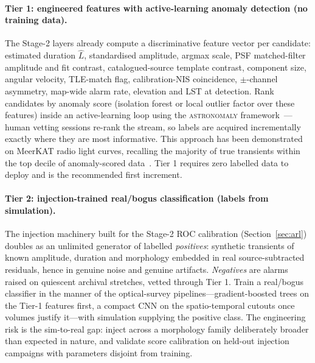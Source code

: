 \documentclass[11pt]{article}
\begin{document}
\paragraph{Tier 1: engineered features with active-learning anomaly detection (no training data).}
The Stage-2 layers already compute a discriminative feature vector per candidate: estimated
duration $\hat L$, standardised amplitude, argmax scale, PSF matched-filter amplitude and fit
contrast, catalogued-source template contrast, component size, angular velocity, TLE-match flag,
calibration-NIS coincidence, $\pm$-channel asymmetry, map-wide alarm rate, elevation and LST at
detection. Rank candidates by anomaly score (isolation forest or local outlier factor over these
features) inside an active-learning loop using the \textsc{astronomaly}
framework~\cite{lochner}---human vetting sessions re-rank the stream, so labels are acquired
incrementally exactly where they are most informative. This approach has been demonstrated on
MeerKAT radio light curves, recalling the majority of true transients within the top decile of
anomaly-scored data~\cite{andersson}. Tier 1 requires zero labelled data to deploy and is the
recommended first increment.

\paragraph{Tier 2: injection-trained real/bogus classification (labels from simulation).} The
injection machinery built for the Stage-2 ROC calibration (Section~\ref{sec:arl}) doubles as an
unlimited generator of labelled \emph{positives}: synthetic transients of known amplitude, duration
and morphology embedded in real source-subtracted residuals, hence in genuine noise and genuine
artifacts. \emph{Negatives} are alarms raised on quiescent archival stretches, vetted through
Tier 1. Train a real/bogus classifier in the manner of the optical-survey pipelines---gradient-boosted
trees on the Tier-1 features first, a compact CNN on the spatio-temporal cutouts once volumes
justify it---with simulation supplying the positive class. The engineering risk is the sim-to-real
gap: inject across a morphology family deliberately broader than expected in nature, and validate
score calibration on held-out injection campaigns with parameters disjoint from training.
\end{document}
